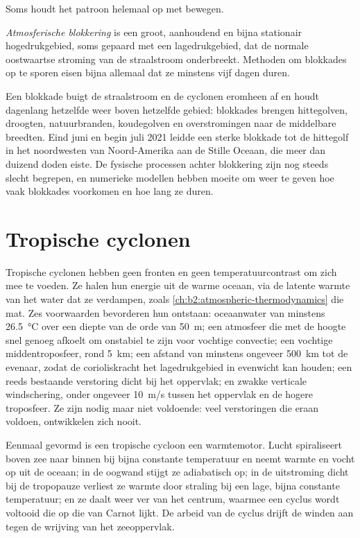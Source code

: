 Soms houdt het patroon helemaal op met bewegen.

\begin{definition}\label{def:b2:weather-systems:blocking}
\emph{Atmosferische blokkering} is een groot, aanhoudend en bijna
stationair hogedrukgebied, soms gepaard met een lagedrukgebied, dat de normale oostwaartse
stroming van de straalstroom onderbreekt. Methoden om blokkades op te sporen eisen bijna allemaal dat ze minstens vijf
dagen duren.
\end{definition}

Een blokkade buigt de straalstroom en de cyclonen eromheen af en houdt dagenlang hetzelfde weer boven hetzelfde
gebied: blokkades brengen hittegolven, droogten, natuurbranden, koudegolven en overstromingen naar de
middelbare breedten. Eind juni en begin juli 2021 leidde een sterke blokkade tot de hittegolf in het
noordwesten van Noord-Amerika aan de Stille Oceaan, die meer dan duizend doden eiste. De fysische
processen achter blokkering zijn nog steeds slecht begrepen, en numerieke modellen hebben moeite om
weer te geven hoe vaak blokkades voorkomen en hoe lang ze duren.

\section{Tropische cyclonen}\label{sec:b2:weather-systems:tropical}

Tropische cyclonen hebben geen fronten en geen temperatuurcontrast om zich mee te voeden. Ze halen hun energie
uit de warme oceaan, via de latente warmte van het water dat ze verdampen, zoals \cref{ch:b2:atmospheric-thermodynamics}
die mat. Zes voorwaarden bevorderen hun ontstaan: oceaanwater van minstens \qty{26.5}{\celsius}
over een diepte van de orde van \qty{50}{m}; een atmosfeer die met de hoogte snel genoeg afkoelt om
onstabiel te zijn voor vochtige convectie; een vochtige middentroposfeer, rond \qty{5}{km}; een afstand van
minstens ongeveer \qty{500}{km} tot de evenaar, zodat de corioliskracht het lagedrukgebied in
evenwicht kan houden; een reeds bestaande verstoring dicht bij het oppervlak; en zwakke verticale windschering, onder ongeveer
\qty{10}{m/s} tussen het oppervlak en de hogere troposfeer. Ze zijn nodig maar niet
voldoende: veel verstoringen die eraan voldoen, ontwikkelen zich nooit.

Eenmaal gevormd is een tropische cycloon een warmtemotor. Lucht spiraliseert boven zee naar binnen bij bijna
constante temperatuur en neemt warmte en vocht op uit de oceaan; in de oogwand stijgt ze
adiabatisch op; in de uitstroming dicht bij de tropopauze verliest ze warmte door straling bij een lage,
bijna constante temperatuur; en ze daalt weer ver van het centrum, waarmee een cyclus wordt voltooid die
op die van Carnot lijkt. De arbeid van de cyclus drijft de winden aan tegen de wrijving van het
zeeoppervlak.

